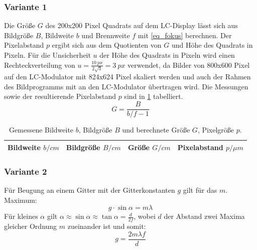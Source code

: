 \documentclass[
	a4paper,
	12pt,
	pagesize,
	ngerman
]{scrartcl}
\begin{document}
			\subsubsection*{Variante 1}

			Die Größe $G$ des \SI{200}{}x\SI{200}{} Pixel Quadrats auf dem LC-Display lässt sich aus Bildgröße $B$, Bildweite $b$ und Brennweite $f$ mit \cref{eq_fokus} berechnen. %
			Der Pixelabstand $p$ ergibt sich aus dem Quotienten von $G$ und Höhe des Quadrats in Pixeln.
			Für die Unsicherheit $u$ der Höhe des Quadrats in Pixeln wird einen Rechteckverteilung  von $u = \frac{\SI{10}{px}}{2\sqrt{3}}= \SI{3}{px}$ verwendet, da Bilder von 800x600 Pixel auf den LC-Modulator mit 824x624 Pixel skaliert werden und auch der Rahmen des Bildprogramms mit an den LC-Modulator übertragen wird.
			Die Messungen sowie der resultierende Pixelabstand $p$ sind in \cref{tb_pixel} tabelliert.
			\begin{equation}
				\label{eq_fokus}
				G = \frac{B}{b/f-1}
			\end{equation}

\begin{table}[H]
		\centering
		\begin{tabular}{ c | c | c | c }
			 Bildweite $b/\si{cm}$ & Bildgröße $B/\si{cm}$ & Größe $G/\si{cm}$ & Pixelabstand $p/\si{\mu m}$ \\ \hline
			 
		\end{tabular}
		\caption{
		Gemessene Bildweite $b$, Bildgröße $B$ und berechnete Größe $G$, Pixelgröße $p$.
		}
		\label{tb_pixel}
\end{table}
			\subsubsection*{Variante 2}

			Für Beugung an einem Gitter mit der Gitterkonstanten $g$ gilt für das $m$. Maximum:
			\begin{equation}
				g \cdot \sin{\alpha} = m \lambda
			\end{equation}
			Für kleines $\alpha$ gilt $\alpha\approx\sin{\alpha}\approx\tan{\alpha}=\frac{d}{2f}$, wobei $d$ der Abstand zwei Maxima gleicher Ordnung $m$  zueinander ist und somit:
			\begin{equation}
				g = \frac{2m\lambda f}{d}
			\end{equation}
\end{document}
